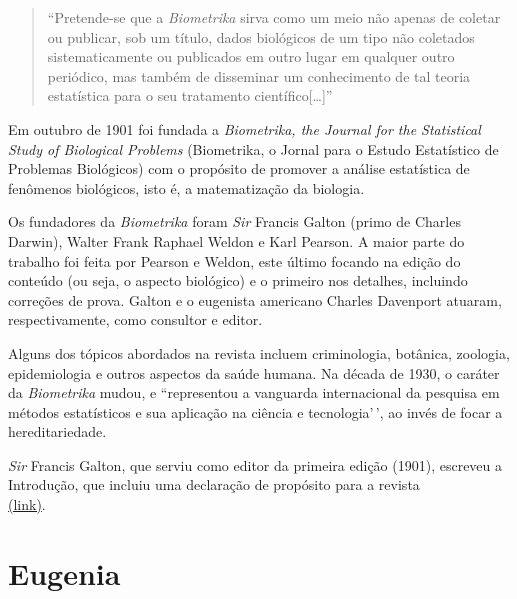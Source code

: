 \documentclass[
]{book}
\begin{document}
\hfill\break

\begin{quote}
``Pretende-se que a \emph{Biometrika} sirva como um meio não apenas de coletar ou publicar, sob um título, dados biológicos de um tipo não coletados sistematicamente ou publicados em outro lugar em qualquer outro periódico, mas também de disseminar um conhecimento de tal teoria estatística para o seu tratamento científico{[}\ldots{]}''
\end{quote}

\hfill\break

Em outubro de 1901 foi fundada a \emph{Biometrika, the Journal for the Statistical Study of Biological Problems} (Biometrika, o Jornal para o Estudo Estatístico de Problemas Biológicos) com o propósito de promover a análise estatística de fenômenos biológicos, isto é, a matematização da biologia.

\hfill\break

Os fundadores da \emph{Biometrika} foram \emph{Sir} Francis Galton (primo de Charles Darwin), Walter Frank Raphael Weldon e Karl Pearson. A maior parte do trabalho foi feita por Pearson e Weldon, este último focando na edição do conteúdo (ou seja, o aspecto biológico) e o primeiro nos detalhes, incluindo correções de prova. Galton e o eugenista americano Charles Davenport atuaram, respectivamente, como consultor e editor.

\hfill\break

Alguns dos tópicos abordados na revista incluem criminologia, botânica, zoologia, epidemiologia e outros aspectos da saúde humana. Na década de 1930, o caráter da \emph{Biometrika} mudou, e ``representou a vanguarda internacional da pesquisa em métodos estatísticos e sua aplicação na ciência e tecnologia'\,', ao invés de focar a hereditariedade.

\hfill\break

\emph{Sir} Francis Galton, que serviu como editor da primeira edição (1901), escreveu a Introdução, que incluiu uma declaração de propósito para a revista\\
\href{https://academic.oup.com/biomet/article-abstract/1/1/1/192192?redirectedFrom=fulltext}{(link)}.

\hfill\break

\hypertarget{eugenia}{%
\section{Eugenia}\label{eugenia}}
\end{document}
